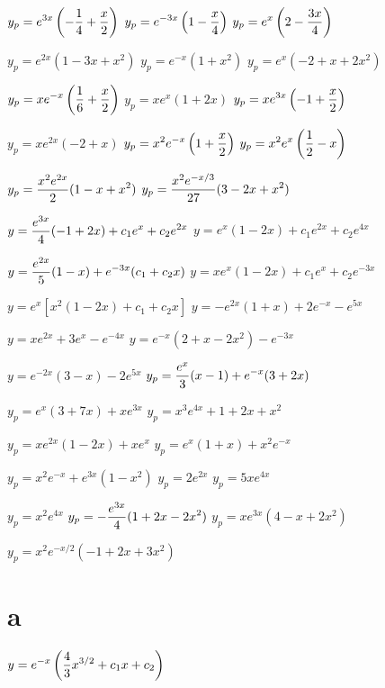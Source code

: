 \medskip

 $y_{p}=\displaystyle{e^{3x}\left(-\frac{1}{4}+\frac{x}{2}\right)}$
 $y_{p}=\displaystyle{e^{-3x}\left(1-\frac{x}{4}\right)}$
 $y_{p}=\displaystyle{e^{x}\left(2-\frac{3x}{4}\right)}$

  $y_{p}=e^{2x}(1-3x+x^{2})$
 $y_{p}=e^{-x}(1+x^{2})$
 $y_{p}=e^{x}(-2+x+2x^{2})$

 $y_{p}=\displaystyle{xe^{-x}\left(\frac{1}{6}+\frac{x}{2}\right)}$
 $y_{p}=xe^{x}(1+2x)$
 $y_{p}=\displaystyle{xe^{3x}}\left(-1+\frac{x}{2}\right)$

 $y_{p}=xe^{2x}(-2+x)$
 $y_{p}=\displaystyle{x^{2}e^{-x}\left(1+\frac{x}{2}\right)}$
 $y_{p}=\displaystyle{x^{2}e^{x}\left(\frac{1}{2}-x\right)}$

 $y_{p}=\displaystyle{\frac{x^{2}e^{2x}}{2}(1-x+x^{2})}$
 $y_{p}=\displaystyle{\frac{x^{2}e^{-x/3}}{27}(3-2x+x^{2})}$

 $y=\displaystyle\frac{e^{3x}}{4}(-1+2x)+c_{1}e^{x}+c_{2}e^{2x}$
  $y=e^{x}(1-2x)+c_{1}e^{2x}+c_{2}e^{4x}$

 $y=\displaystyle\frac{e^{2x}}{5}(1-x)+e^{-3x}(c_{1}+c_{2}x)$
  $y=xe^{x}(1-2x)+c_{1}e^{x}+c_{2}e^{-3x}$

$y=e^{x}\left[x^{2}(1-2x)+c_{1}+c_{2}x\right]$
 $y=-e^{2x}(1+x)+2e^{-x}-e^{5x}$

 $y=xe^{2x}+3e^{x}-e^{-4x}$
 $y=e^{-x}(2+x-2x^{2})-e^{-3x}$

 $y=e^{-2x}(3-x)-2e^{5x}$
 $y_{p}=\displaystyle{\frac{e^{x}}{3}(x-1)+e^{-x}(3+2x)}$

 $y_{p}=e^{x}(3+7x)+xe^{3x}$
 $y_{p}=x^{3}e^{4x}+1+2x+x^{2}$

 $y_{p}=xe^{2x}(1-2x)+xe^{x}$
 $y_{p}=e^{x}(1+x)+x^{2}e^{-x}$

 $y_{p}=x^{2}e^{-x}+e^{3x}(1-x^{2})$
 $y_{p}=2e^{2x}$
 $y_{p}=5xe^{4x}$

 $y_{p}=x^{2}e^{4x}$
 $y_{p}=-\displaystyle\frac{e^{3x}}{4}(1+2x-2x^{2})$
 $y_{p}=xe^{3x}(4-x+2x^{2})$

 $y_{p}=x^{2}e^{-x/2}(-1+2x+3x^{2})$

 \part{a}
 $y=\displaystyle{e^{-x}\left(\frac{4}{3}x^{3/2}+c_{1}x+c_{2}\right)}$
